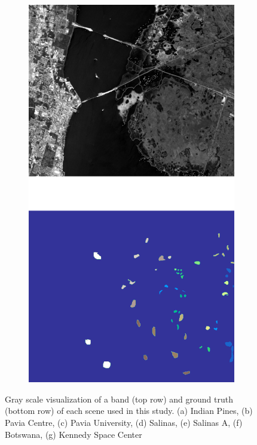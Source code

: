 \documentclass[remotesensing,article,submit,moreauthors,pdftex]{Definitions/mdpi}
\begin{document}
\begin{figure}[H]
\begin{subfigure}{.24\textwidth}
		\includegraphics[height=1.5\linewidth]{../analysis/kennedy_space_center}
		\subcaption{{\medbreak}}\label{fig:kennedy_space_center}
	\end{subfigure}
    \caption{Gray scale visualization of a band (top row) and ground truth
        (bottom row) of each scene used in this study. (a) Indian Pines, (b)
        Pavia Centre, (c) Pavia University, (d) Salinas, (e) Salinas A, (f)
        Botswana, (g) Kennedy Space Center }\label{fig:scenes}
\end{figure}
\end{document}
